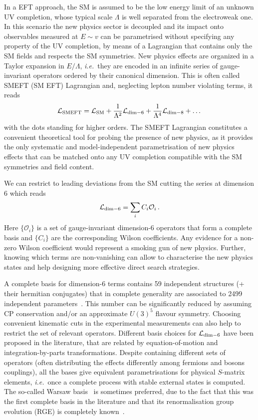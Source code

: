 In a EFT approach, the SM is assumed to be the low energy limit of an unknown UV completion, whose typical scale $\Lambda$ is well separated from the electroweak one.
In this scenario the new physics sector is decoupled and its impact onto observables measured at $E\sim v$ can be parametrised without specifying any property of the UV completion, by means of a Lagrangian that contains only the SM fields and respects the SM symmetries.
New physics effects are organized in a Taylor expansion in $E/\Lambda$, \emph{i.e.}\ they are encoded in an infinite series of gauge-invariant operators ordered by their canonical dimension.
This is often called SMEFT (SM EFT) Lagrangian and, neglecting lepton number violating terms, it reads
\begin{equation}
 \mathcal{L}_{\rm SMEFT} = \mathcal{L}_{\rm SM} + \frac{1}{\Lambda^2}\mathcal{L}_{\rm dim-6} + \frac{1}{\Lambda^4}\mathcal{L}_{\rm dim-8} + \dots
\end{equation} 
with the dots standing for higher orders.
The SMEFT Lagrangian constitutes a convenient theoretical tool for probing the presence of new physics, as it provides the only systematic and model-independent parametrisation of new physics effects that can be matched onto any UV completion compatible with the SM symmetries and field content.

We can restrict to leading deviations from the SM cutting the series at dimension 6 which reads
\begin{equation}
 \mathcal{L}_{\rm dim-6} = \sum_i C_i \mathcal{O}_i\,.
\end{equation} 
Here $\{\mathcal{O}_i\}$ is a set of gauge-invariant dimension-6 operators that form a complete basis and $\{C_i\}$ are the corresponding Wilson coefficients.
%
Any evidence for a non-zero Wilson coefficient would represent a smoking gun of new physics.
Further, knowing which terms are non-vanishing can allow to characterise the new physics states and help designing more effective direct search strategies.


A complete basis for dimension-6 terms contains 59 independent structures (+ their hermitian conjugates) that in complete generality are associated to 2499 independent parameters~\cite{Alonso:2013hga}.
This number can be significantly reduced by assuming CP conservation and/or an approximate $U(3)^5$ flavour symmetry.
Choosing convenient kinematic cuts in the experimental measurements can also help to restrict the set of relevant operators.
Different basis choices for $\mathcal{L}_{\rm dim-6}$ have been proposed in the literature, that are related by equation-of-motion and integration-by-parts transformations. 
Despite containing different sets of operators (often distributing the effects differently among fermions and bosons couplings), all the bases give equivalent parametrisations for physical $S$-matrix elements, \emph{i.e.}\ once a complete process with stable external states is computed. 
The so-called Warsaw basis~\cite{Grzadkowski:2010es} is sometimes preferred, due to the fact that this was the first complete basis in the literature and that its renormalisation group evolution (RGE) is completely known~\cite{Jenkins:2013zja,Jenkins:2013wua,Alonso:2013hga,Grojean:2013kd,Alonso:2014zka}.


